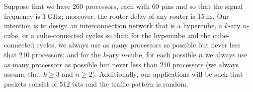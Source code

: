   \question Suppose that we have 260 processors, each with 60 pins and so that the signal frequency is $\SI{1}{\giga\hertz}$; moreover, the router delay of any router is $\SI{15}{\nano\second}$. Our intention is to design an interconnection network that is a hypercube, a $k$-ary $n$-cube, or a cube-connected cycles so that: for the hypercube and the cube-connected cycles, we always use as many processors as possible but never less that 210 processors; and for the $k$-ary $n$-cube, for each possible $n$ we always use as many processors as possible but never less than 210 processors (we always assume that $k \geq 3$ and $n \geq 2$). Additionally, our applications will be such that packets consist of 512 bits and the traffic pattern is random.
